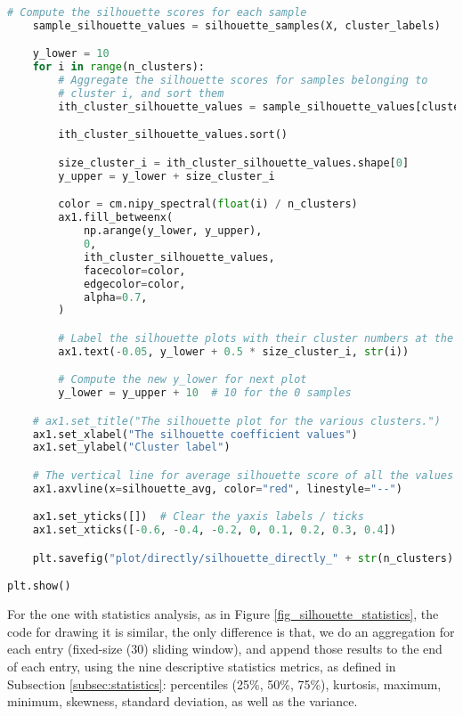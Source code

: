 \begin{lstlisting}[language=Python]
    # Compute the silhouette scores for each sample
    sample_silhouette_values = silhouette_samples(X, cluster_labels)

    y_lower = 10
    for i in range(n_clusters):
        # Aggregate the silhouette scores for samples belonging to
        # cluster i, and sort them
        ith_cluster_silhouette_values = sample_silhouette_values[cluster_labels == i]

        ith_cluster_silhouette_values.sort()

        size_cluster_i = ith_cluster_silhouette_values.shape[0]
        y_upper = y_lower + size_cluster_i

        color = cm.nipy_spectral(float(i) / n_clusters)
        ax1.fill_betweenx(
            np.arange(y_lower, y_upper),
            0,
            ith_cluster_silhouette_values,
            facecolor=color,
            edgecolor=color,
            alpha=0.7,
        )

        # Label the silhouette plots with their cluster numbers at the middle
        ax1.text(-0.05, y_lower + 0.5 * size_cluster_i, str(i))

        # Compute the new y_lower for next plot
        y_lower = y_upper + 10  # 10 for the 0 samples

    # ax1.set_title("The silhouette plot for the various clusters.")
    ax1.set_xlabel("The silhouette coefficient values")
    ax1.set_ylabel("Cluster label")

    # The vertical line for average silhouette score of all the values
    ax1.axvline(x=silhouette_avg, color="red", linestyle="--")

    ax1.set_yticks([])  # Clear the yaxis labels / ticks
    ax1.set_xticks([-0.6, -0.4, -0.2, 0, 0.1, 0.2, 0.3, 0.4])

    plt.savefig("plot/directly/silhouette_directly_" + str(n_clusters) + ".pdf", format="pdf", bbox_inches="tight")

plt.show()
\end{lstlisting}

For the one with statistics analysis, as in Figure \ref{fig_silhouette_statistics}, the code for drawing it is similar, the only difference is that, we do an aggregation for each entry (fixed-size (30) sliding window), and append those results to the end of each entry, using the nine descriptive statistics metrics, as defined in Subsection \ref{subsec:statistics}: percentiles (25\%, 50\%, 75\%), kurtosis, maximum, minimum, skewness, standard deviation, as well as the variance.
